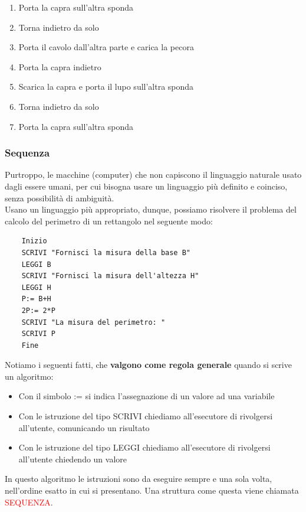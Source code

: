 \documentclass{article}
\begin{document}
	\begin{enumerate}
		\item Porta la capra sull'altra sponda
		\item Torna indietro da solo
		\item Porta il cavolo dall'altra parte e carica la pecora
		\item Porta la capra indietro
		\item Scarica la capra e porta il lupo sull'altra sponda
		\item Torna indietro da solo
		\item Porta la capra sull'altra sponda
	\end{enumerate}	
	\subsubsection{Sequenza}
	Purtroppo, le macchine (computer) che non capiscono il linguaggio naturale usato dagli essere umani, per cui bisogna usare un linguaggio più definito e coinciso, senza possibilità di ambiguità.\\
	Usano un linguaggio più appropriato, dunque, possiamo risolvere il problema del calcolo del perimetro di un rettangolo nel seguente modo:\\
	\begin{lstlisting}
	Inizio
	SCRIVI "Fornisci la misura della base B"
	LEGGI B
	SCRIVI "Fornisci la misura dell'altezza H"
	LEGGI H
	P:= B+H
	2P:= 2*P
	SCRIVI "La misura del perimetro: "
	SCRIVI P
	Fine
	\end{lstlisting}
	Notiamo i seguenti fatti, che \textbf{valgono come regola generale} quando si scrive un algoritmo:
	\begin{itemize}
		\item Con il simbolo := si indica l'assegnazione di un valore ad una variabile
		\item Con le istruzione del tipo SCRIVI chiediamo all'esecutore di rivolgersi all'utente, comunicando un risultato
		\item Con le istruzione del tipo LEGGI chiediamo all'esecutore di rivolgersi all'utente chiedendo un valore
	\end{itemize}
	In questo algoritmo le istruzioni sono da eseguire sempre e una sola volta, nell'ordine esatto in cui si presentano. Una struttura come questa viene chiamata \textcolor{red}{SEQUENZA}.
\end{document}
